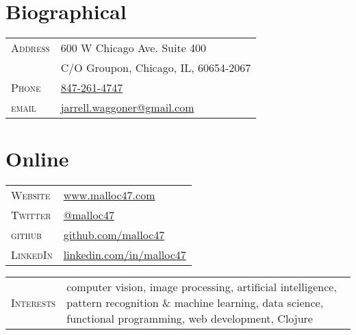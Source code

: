 \documentclass[10pt]{article}
\begin{document}
\pagestyle{empty}

\par{\bigskip\par}

\begin{multicols}{2}
\setlength{\parskip}{0pt}
\section{Biographical}
\begin{tabularx}{\linewidth}{@{}l X@{}}
  \textsc{Address} & \small{600 W Chicago Ave. Suite 400} \\
                   & \small{C/O Groupon, Chicago, IL, 60654-2067} \\
  \textsc{Phone}   & \href{http://www.malloc47.com/call-me/}{847-261-4747}\\
  \textsc{email}   & \href{mailto:jarrell.waggoner@gmail.com}{jarrell.waggoner@gmail.com} \\
\end{tabularx}

\vfill
\columnbreak

\section{Online}
\begin{tabularx}{\linewidth}{@{}l X@{}}
  \textsc{Website}	& \href{http://www.malloc47.com}{www.malloc47.com} \\
  \textsc{Twitter}     & \href{https://twitter.com/malloc47}{@malloc47} \\
  \textsc{github}      & \href{http://www.github.com/malloc47}{github.com/malloc47}\\
  \textsc{LinkedIn}    & \href{http://www.linkedin.com/in/malloc47}{linkedin.com/in/malloc47} \\
\end{tabularx}

\end{multicols}

\begin{tabularx}{\textwidth}{@{}l X}
  \textsc{Interests} & computer vision, image processing, artificial
  intelligence, pattern recognition \& machine learning, data science,
  functional programming, web development, Clojure
\end{tabularx}

\newcommand{\degree}[4]{\textsc{#1} & \textbf{#2} & \textsc{#3} & \textbf{#4}\\}
\end{document}
